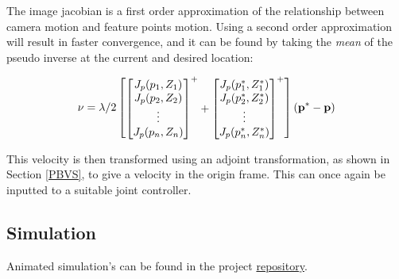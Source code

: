 \documentclass{UoNMCHA}
\numberwithin{equation}{section}
\begin{document}
The image jacobian is a first order approximation of the relationship between camera motion and feature points motion. Using a second order approximation will result in faster convergence, and it can be found by taking the \textit{mean} of the pseudo inverse at the current and desired location:

\begin{equation}
\label{meanvelocityimagejacobian}
\mathbf{\nu} = \\
	\lambda/2 \\
	\begin{bmatrix}
	{\begin{bmatrix} 
	J_{p}(p_{1} , Z_{1})   \\
	J_{p}(p_{2} , Z_{2})   \\
	\vdots \\
	J_{p}(p_{n} , Z_{n}) \\
	\end{bmatrix}}^{+} +
	{\begin{bmatrix} 
	J_{p}(p^{*}_{1} , Z^{*}_{1})   \\
	J_{p}(p^{*}_{2} , Z^{*}_{2})   \\
	\vdots \\
	J_{p}(p^{*}_{n} , Z^{*}_{n}) \\
	\end{bmatrix}}^{+} \\
	\end{bmatrix} \\
	(\mathbf{p^{*}} - \mathbf{p})		
\end{equation} 

This velocity is then transformed using an adjoint transformation, as shown in Section \ref{PBVS}, to give a velocity in the origin frame. This can once again be inputted to a suitable joint controller.

\subsection{Simulation}

Animated simulation's can be found in the project \href{https://github.com/Hashkhan98/Vision-Based-Control-of-an-Industrial-Robotic-Manipulator}{repository}. 
\end{document}
